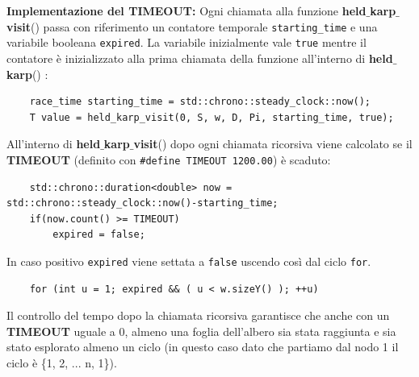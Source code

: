 \documentclass[]{article}
\begin{document}
\begin{flushleft}
\bigskip
\textbf{Implementazione del TIMEOUT:}
Ogni chiamata alla funzione \textbf{held$\_$karp$\_$visit}() passa con riferimento un contatore temporale \verb|starting_time| e una variabile booleana \verb|expired|.
La variabile inizialmente vale \verb|true| mentre il contatore è inizializzato alla prima chiamata della funzione all'interno di \textbf{held$\_$karp}() :
\lstset{language=c++, style=mystyle, firstnumber=40}
\begin{lstlisting}
	race_time starting_time = std::chrono::steady_clock::now();
	T value = held_karp_visit(0, S, w, D, Pi, starting_time, true);
\end{lstlisting}
\smallskip
All'interno di \textbf{held$\_$karp$\_$visit}() dopo ogni chiamata ricorsiva viene calcolato se il \textbf{TIMEOUT} (definito con \verb|#define TIMEOUT 1200.00|) è scaduto:
\lstset{language=c++, style=mystyle, firstnumber=21}
\begin{lstlisting}
	std::chrono::duration<double> now = std::chrono::steady_clock::now()-starting_time;
	if(now.count() >= TIMEOUT)
    	expired = false;
\end{lstlisting}
In caso positivo \verb|expired| viene settata a \verb|false| uscendo così dal ciclo \verb|for|.
\lstset{language=c++, style=mystyle, firstnumber=14}
\begin{lstlisting}
	for (int u = 1; expired && ( u < w.sizeY() ); ++u)
\end{lstlisting}
\medskip
Il controllo del tempo dopo la chiamata ricorsiva garantisce che anche con un \textbf{TIMEOUT} uguale a 0, almeno una foglia dell'albero sia stata raggiunta e sia stato esplorato almeno un ciclo (in questo caso dato che partiamo dal nodo 1 il ciclo è \{1, 2, ... n, 1\}).
\end{flushleft}

\newpage
\end{document}
